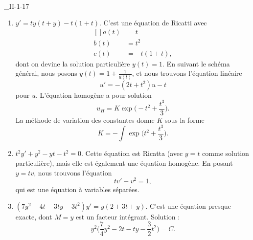 \begin{corrige}{_II-1-17}
\begin{enumerate}
		\item
		      $y'=ty(t+y)-t(1+t)$. C'est une équation de Ricatti avec
		      \begin{equation}
			      \begin{aligned}[]
				      a(t) & =t        \\
				      b(t) & =t^2      \\
				      c(t) & =-t(1+t),
			      \end{aligned}
		      \end{equation}
		      dont on devine la solution particulière $y(t)=1$. En suivant le schéma général, nous posons $y(t)=1+\frac{1}{ u(t) }$, et nous trouvons l'équation linéaire
		      \begin{equation}
			      u'=-(2t+t^2)u-t
		      \end{equation}
		      pour $u$. L'équation homogène a pour solution
		      \begin{equation}
			      u_H=K\exp\big( -t^2+\frac{ t^3 }{ 3 } \big).
		      \end{equation}
		      La méthode de variation des constantes donne $K$ sous la forme
		      \begin{equation}
			      K=-\int \exp\big( t^2+\frac{ t^3 }{ 3 } \big).
		      \end{equation}

		\item
		      $t^2y'+y^2-yt-t^2=0$.
		      Cette équation est Ricatta (avec $y=t$ comme solution particulière), mais elle est également une équation homogène. En posant $y=tv$, nous trouvons l'équation
		      \begin{equation}
			      tv'+v^2=1,
		      \end{equation}
		      qui est une équation à variables séparées.

		\item
		      $(7y^2-4t-3ty-3t^2)y'=y(2+3t+y)$. C'est une équation presque exacte, dont $M=y$ est un facteur intégrant. Solution :
		      \begin{equation}
			      y^2\big( \frac{ 7 }{ 4 }y^2-2t-ty-\frac{ 3 }{ 2 }t^2 \big)=C.
		      \end{equation}


\end{enumerate}
\end{corrige}
